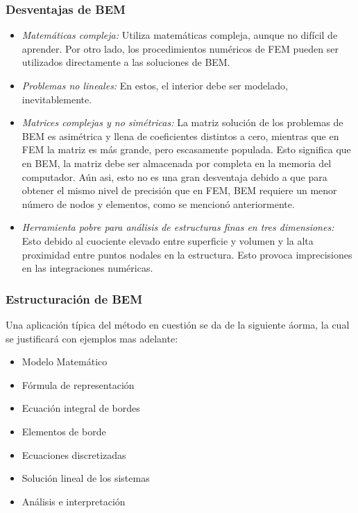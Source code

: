 \documentclass[12pt,letterpaper]{article}
\numberwithin{equation}{section}
\begin{document}
\subsubsection{Desventajas de BEM}
\begin{itemize}
	\item \textit{Matemáticas compleja:} Utiliza matemáticas compleja, aunque no difícil de aprender. Por otro lado, los procedimientos numéricos de FEM pueden ser utilizados directamente a las soluciones de BEM.
	\item \textit{Problemas no lineales:} En estos, el interior debe ser modelado, inevitablemente. 
	\item \textit{Matrices complejas y no simétricas:} La matriz solución de los problemas de BEM es asimétrica y llena de coeficientes distintos a cero, mientras que en FEM la matriz es más grande, pero escasamente populada. Esto significa que en BEM, la matriz debe ser almacenada por completa en la memoria del computador. Aún asi, esto no es una gran desventaja debido a que para obtener el mismo nivel de precisión que en FEM, BEM requiere un menor número de nodos y elementos, como se mencionó anteriormente.
	\item \textit{Herramienta pobre para análisis de estructuras finas en tres dimensiones:} Esto debido al cuociente elevado entre superficie y volumen y la alta proximidad entre puntos nodales en la estructura. Esto provoca imprecisiones en las integraciones numéricas.
\end{itemize}

\subsubsection{Estructuración de BEM}
Una aplicación típica del método en cuestión se da de la siguiente áorma, la cual se justificará con ejemplos mas adelante:

\begin{itemize}
	\item Modelo Matemático
	\item Fórmula de representación
	\item Ecuación integral de bordes
	\item Elementos de borde
	\item Ecuaciones discretizadas
	\item Solución lineal de los sistemas
	\item Análisis e interpretación
\end{itemize}
\end{document}
